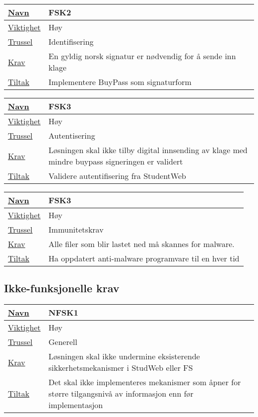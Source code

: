 \begin{tabularx}{\textwidth}{|l|X|}
  \hline
  \underline{Navn} & FSK2 \\ \hline
  \underline{Viktighet} & Høy \\ \hline
  \underline{Trussel} & Identifisering \\ \hline
  \underline{Krav} & En gyldig norsk signatur er nødvendig for å sende inn klage \\ \hline
  \underline{Tiltak} & Implementere BuyPass som signaturform \\ \hline
\end{tabularx}

\begin{tabularx}{\textwidth}{|l|X|}
  \hline
  \underline{Navn} & FSK3 \\ \hline
  \underline{Viktighet} & Høy \\ \hline
  \underline{Trussel} & Autentisering \\ \hline
  \underline{Krav} & Løsningen skal ikke tilby digital innsending av klage med mindre buypass signeringen er validert \\ \hline
  \underline{Tiltak} & Validere autentifisering fra StudentWeb \\ \hline
\end{tabularx}

\begin{tabularx}{\textwidth}{|l|X|}
  \hline
  \underline{Navn} & FSK3 \\ \hline
  \underline{Viktighet} & Høy \\ \hline
  \underline{Trussel} & Immunitetskrav \\ \hline
  \underline{Krav} & Alle filer som blir lastet ned må skannes for malware. \\ \hline
  \underline{Tiltak} & Ha oppdatert anti-malware programvare til en hver tid \\ \hline
\end{tabularx}

\subsection{Ikke-funksjonelle krav}

\begin{tabularx}{\textwidth}{|l|X|}
  \hline
  \underline{Navn} & NFSK1 \\ \hline
  \underline{Viktighet} & Høy \\ \hline
  \underline{Trussel} & Generell \\ \hline
  \underline{Krav} & Løsningen skal ikke undermine eksisterende sikkerhetsmekanismer i StudWeb eller FS \\ \hline
  \underline{Tiltak} & Det skal ikke implementeres mekanismer som åpner for større tilgangsnivå av informasjon enn før implementasjon \\ \hline
\end{tabularx}

